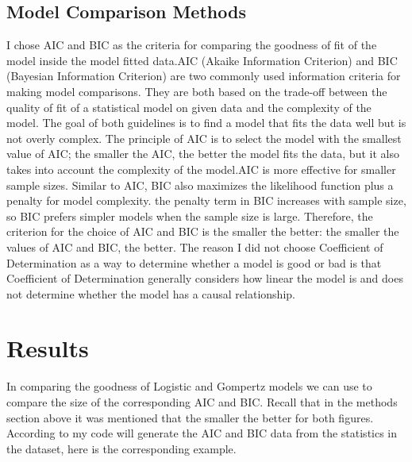 \documentclass[11pt]{article}
\begin{document}
\subsection{Model Comparison Methods}
I chose AIC and BIC as the criteria for comparing the goodness of fit of the model inside the model fitted data.AIC (Akaike Information Criterion) and BIC (Bayesian Information Criterion) are two commonly used information criteria for making model comparisons. They are both based on the trade-off between the quality of fit of a statistical model on given data and the complexity of the model. The goal of both guidelines is to find a model that fits the data well but is not overly complex. The principle of AIC is to select the model with the smallest value of AIC; the smaller the AIC, the better the model fits the data, but it also takes into account the complexity of the model.AIC is more effective for smaller sample sizes. Similar to AIC, BIC also maximizes the likelihood function plus a penalty for model complexity. the penalty term in BIC increases with sample size, so BIC prefers simpler models when the sample size is large. Therefore, the criterion for the choice of AIC and BIC is the smaller the better: the smaller the values of AIC and BIC, the better. The reason I did not choose Coefficient of Determination as a way to determine whether a model is good or bad is that Coefficient of Determination generally considers how linear the model is and does not determine whether the model has a causal relationship.

\section{Results}
In comparing the goodness of Logistic and Gompertz models we can use to compare the size of the corresponding AIC and BIC. Recall that in the methods section above it was mentioned that the smaller the better for both figures. According to my code will generate the AIC and BIC data from the statistics in the dataset, here is the corresponding example. 
\end{document}
